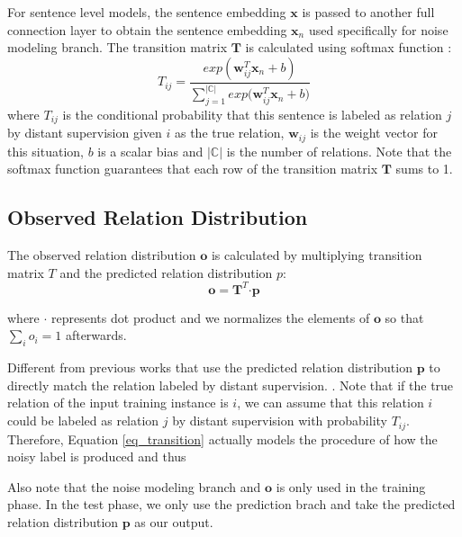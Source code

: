 For sentence level models, the sentence embedding $\mathbf{x}$ is passed to another full connection layer to obtain the sentence embedding $\mathbf{x}_n$ used specifically for noise modeling branch. The transition matrix $\mathbf{T}$ is calculated using softmax function :
\begin{equation}
T_{ij} = \frac{exp({\mathbf{w}_{ij}^T \mathbf{x}_n + b})}{\sum_{j=1}^{|\mathbb{C}|}{exp({\mathbf{w}_{ij}^T \mathbf{x}_n + b}})}
\end{equation}
where $T_{ij}$ is the conditional probability that this sentence is labeled as relation $j$ by distant supervision given $i$ as the true relation, $\mathbf{w}_{ij}$ is the weight vector for this situation, $b$ is a scalar bias and $|\mathbb{C}|$ is the number of relations. Note that the softmax function guarantees that each row of the transition matrix $\mathbf{T}$ sums to 1.

\subsection{Observed Relation Distribution}
The observed relation distribution $\mathbf{o}$ is calculated by multiplying transition matrix $T$ and the predicted relation distribution $p$:
 \begin{equation}
\mathbf{o} = \mathbf{T}^T \bm\cdot \mathbf{p}
\label{eq_transition}
 \end{equation}

 where $\bm\cdot$ represents dot product and we normalizes the elements of $\mathbf{o}$ so that $\sum_i{o_i}=1$ afterwards.

Different from previous works that use the predicted relation distribution $\mathbf{p}$ to directly match the relation labeled by distant supervision. . Note that if the true relation of the input training instance is $i$, we can assume that this relation $i$ could be labeled as relation $j$ by distant supervision with probability $T_{ij}$. Therefore, Equation \ref{eq_transition} actually models the procedure of how the noisy label is produced and thus 

Also note that the noise modeling branch and $\mathbf{o}$ is only used in the training phase. In the test phase, we only use the prediction brach and take the predicted relation distribution $\mathbf{p}$ as our output. 

